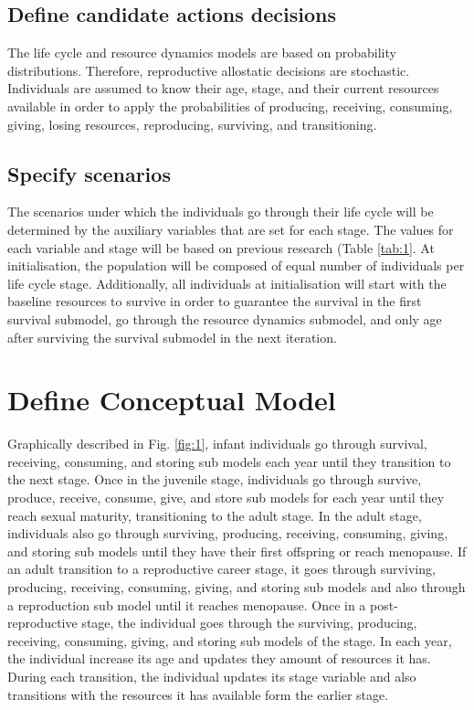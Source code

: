 \documentclass{article}
\begin{document}
\subsection{Define candidate actions decisions}

The life cycle and resource dynamics models are based on probability distributions. Therefore, reproductive allostatic decisions are stochastic. Individuals are assumed to know their age, stage, and their current resources available  in order to apply the probabilities of producing, receiving, consuming, giving, losing resources, reproducing, surviving, and transitioning.

\subsection{Specify scenarios}

The scenarios under which the individuals go through their life cycle will be determined by the auxiliary variables that are set for each stage. The values for each variable and stage will be based on previous research (Table \ref{tab:1}. At initialisation, the population will be composed of equal number of individuals per life cycle stage. Additionally, all individuals at initialisation will start with the baseline resources to survive in order to guarantee the survival in the first survival submodel, go through the resource dynamics submodel, and only age after surviving the survival submodel in the next iteration. 

\section{Define Conceptual Model}

Graphically described in Fig. \ref{fig:1}, infant individuals go through survival, receiving, consuming, and storing sub models each year until they transition to the next stage. Once in the juvenile stage, individuals go through survive, produce, receive, consume, give, and store sub models for each year until they reach sexual maturity, transitioning to the adult stage. In the adult stage, individuals also go through surviving, producing, receiving, consuming, giving, and storing sub models until they have their first offspring or reach menopause. If an adult transition to a reproductive career stage, it goes through surviving, producing, receiving, consuming, giving, and storing sub models and also through a reproduction sub model until it reaches menopause. Once in a post-reproductive stage, the individual goes through the surviving, producing, receiving, consuming, giving, and storing sub models of the stage. In each year, the individual increase its age and updates they amount of resources it has. During each transition, the individual updates its stage variable and also transitions with the resources it has available form the earlier stage.
\end{document}
